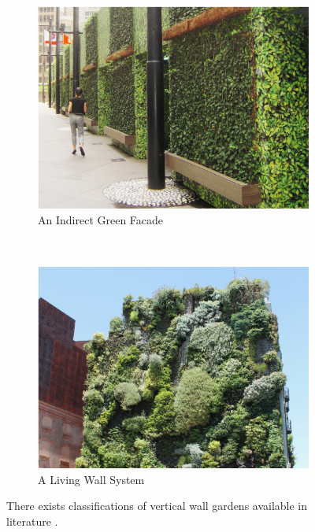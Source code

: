 \documentclass{report}
\begin{document}
\begin{figure}[h]
	\begin{subfigure}[b]{0.5\textwidth}
		\centering
		\includegraphics[width=\textwidth]{images/IndirectGreenFacade.png}
		\caption{An Indirect Green Facade \cite{Manso2015}}
		\label{fig:vertical_farm}
	\end{subfigure}
	~
	\begin{subfigure}[b]{0.505\textwidth}
		\centering
		\includegraphics[width=\textwidth]{images/LivingWallSystem}
		\caption{A Living Wall System \cite{Manso2015}}
		\label{fig:vertical_garden}
	\end{subfigure}
	\caption{There exists classifications of vertical wall gardens available in literature \cite{Manso2015}.}
	\label{fig:vertical_applications}
\end{figure}
\end{document}
